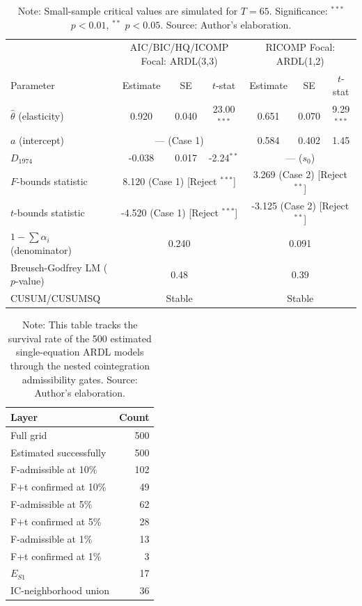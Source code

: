 \begin{table}[H]
\centering
\caption{Stage S1 Focal Single-Equation Estimations}
\label{tab:s1_focal_parameters}
\footnotesize
\begin{tabular}{lcccccc}
\toprule
& \multicolumn{3}{c}{AIC/BIC/HQ/ICOMP Focal: ARDL(3,3)} & \multicolumn{3}{c}{RICOMP Focal: ARDL(1,2)} \\
Parameter & Estimate & SE & $t$-stat & Estimate & SE & $t$-stat \\
\midrule
\midrule
$\hat{\theta}$ (elasticity) & 0.920 & 0.040 & 23.00$^{***}$ & 0.651 & 0.070 & 9.29$^{***}$ \\
$a$ (intercept) & \multicolumn{3}{c}{--- (Case 1)} & 0.584 & 0.402 & 1.45 \\
$D_{1974}$ & -0.038 & 0.017 & -2.24$^{**}$ & \multicolumn{3}{c}{--- ($s_0$)} \\
\midrule
$F$-bounds statistic & \multicolumn{3}{c}{8.120 (Case 1) [Reject $^{***}$]} & \multicolumn{3}{c}{3.269 (Case 2) [Reject $^{**}$]} \\
$t$-bounds statistic & \multicolumn{3}{c}{-4.520 (Case 1) [Reject $^{***}$]} & \multicolumn{3}{c}{-3.125 (Case 2) [Reject $^{**}$]} \\
$1 - \sum \alpha_i$ (denominator) & \multicolumn{3}{c}{0.240} & \multicolumn{3}{c}{0.091} \\
Breusch-Godfrey LM ($p$-value) & \multicolumn{3}{c}{0.48} & \multicolumn{3}{c}{0.39} \\
CUSUM/CUSUMSQ & \multicolumn{3}{c}{Stable} & \multicolumn{3}{c}{Stable} \\
\bottomrule
\end{tabular}
\caption*{\footnotesize Note: Small-sample critical values are simulated for $T=65$. Significance: $^{***}$ $p<0.01$, $^{**}$ $p<0.05$. Source: Author's elaboration.}
\end{table}

\begin{table}[H]
\centering
\caption{S1 Shrinking Specification Space Counts}
\label{tab:s1_shrinking_space_counts}
\small
\begin{tabular}{lr}
\toprule
Layer & Count \\
\midrule
\midrule
Full grid & 500 \\
Estimated successfully & 500 \\
F-admissible at 10\% & 102 \\
F+t confirmed at 10\% & 49 \\
F-admissible at 5\% & 62 \\
F+t confirmed at 5\% & 28 \\
F-admissible at 1\% & 13 \\
F+t confirmed at 1\% & 3 \\
$E_{S1}$ & 17 \\
IC-neighborhood union & 36 \\
\bottomrule
\end{tabular}
\caption*{\footnotesize Note: This table tracks the survival rate of the 500 estimated single-equation ARDL models through the nested cointegration admissibility gates. Source: Author's elaboration.}
\end{table}

